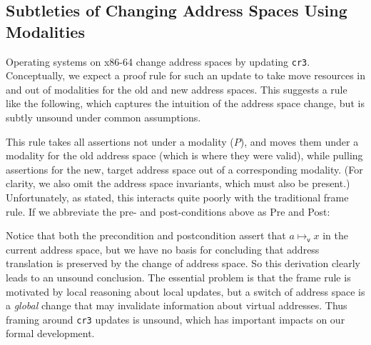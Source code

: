 \subsection{Subtleties of Changing Address Spaces Using Modalities}
\label{sec:issues}
Operating systems on x86-64 change address spaces by updating \lstinline|cr3|.
Conceptually, we expect a proof rule for such an update to take move resources in and out of modalities for
the old and new address spaces. This suggests a rule like the following, which captures the intuition of the
address space change, but is subtly unsound under common assumptions.
\begin{mathpar}
\end{mathpar}
This rule takes all assertions not under a modality ($P$), and moves them under a modality for the old address space
(which is where they were valid), while pulling assertions for the new, target address space out of a corresponding modality.
(For clarity, we also omit the address space invariants, which must also be present.)
Unfortunately, as stated, this interacts quite poorly with the traditional frame
rule.
If we abbreviate the pre- and post-conditions above as \textsf{Pre} and \textsf{Post}:
\begin{mathpar}
\end{mathpar}
Notice that both the precondition and postcondition assert that $a\mapsto_\mathsf{v} x$ in the current address space, but we have no basis for concluding that address translation is preserved by the change of address space. So this derivation clearly leads to an unsound conclusion. 
The essential problem is that the frame rule is motivated by local reasoning about local updates, but
a switch of address space is a \emph{global} change that may invalidate information about virtual addresses.
Thus framing around \lstinline|cr3| updates is unsound, which has important impacts on our formal development.

